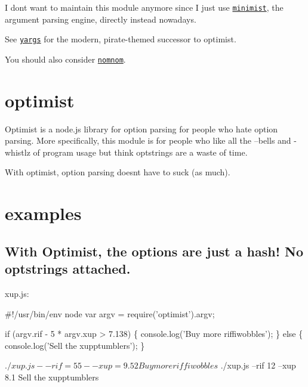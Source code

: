 I don\textquotesingle{}t want to maintain this module anymore since I just use \href{https://npmjs.org/package/minimist}{\tt minimist}, the argument parsing engine, directly instead nowadays.

See \href{https://github.com/chevex/yargs}{\tt yargs} for the modern, pirate-\/themed successor to optimist.

\href{https://github.com/chevex/yargs}{\tt }

You should also consider \href{https://github.com/harthur/nomnom}{\tt nomnom}.

\section*{optimist }

Optimist is a node.\+js library for option parsing for people who hate option parsing. More specifically, this module is for people who like all the --bells and -\/whistlz of program usage but think optstrings are a waste of time.

With optimist, option parsing doesn\textquotesingle{}t have to suck (as much).

\href{http://travis-ci.org/substack/node-optimist}{\tt }

\section*{examples }

\subsection*{With Optimist, the options are just a hash! No optstrings attached. }

xup.\+js\+:


\begin{DoxyCode}
#!/usr/bin/env node
var argv = require('optimist').argv;

if (argv.rif - 5 * argv.xup > 7.138) \{
    console.log('Buy more riffiwobbles');
\}
else \{
    console.log('Sell the xupptumblers');
\}
\end{DoxyCode}




 \begin{DoxyVerb}$ ./xup.js --rif=55 --xup=9.52
Buy more riffiwobbles

$ ./xup.js --rif 12 --xup 8.1
Sell the xupptumblers
\end{DoxyVerb}




